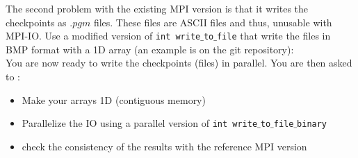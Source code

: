 \documentclass[11pt,a4paper]{article}
\begin{document}
\begin{exercise}
The second problem with the existing MPI version is that it writes the checkpoints as $.pgm$ files. These files are ASCII files and thus, unusable with MPI-IO. Use a modified version of \texttt{int write$\_$to$\_$file} that write the files in BMP format with a 1D array (an example is on the git repository):
\\

You are now ready to write the checkpoints (files) in parallel. You are then asked to :

\begin{itemize}
	\item {Make your arrays 1D (contiguous memory)}
	\item {Parallelize the IO using a parallel version of \texttt{int write$\_$to$\_$file$\_$binary}}
	\item {check the consistency of the results with the reference MPI version}
\end{itemize}


\end{exercise}
\end{document}
